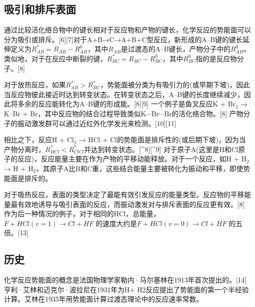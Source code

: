 \subsection{吸引和排斥表面}
通过比较活化络合物中的键长相对于反应物和产物的键长，化学反应的势能面可以分为吸引或排斥。[6][7]对于A+B→C→A+B+C型反应，新形成的A–B键的键长延伸定义为$R^*_{AB} = R_{AB} - R^0_{AB}$，其中$R_{AB}$是过渡态的A–B键长，产物分子中的$R^0_{AB}$。类似地，对于在反应中断裂的键，$R^*_{BC} = R_{BC} - R^0_{BC}$，其中$R^0_{BC}$指的是反应物分子。[8]

对于放热反应，如果$R^*_{AB} > R^*_{BC}$，势能面被分类为有吸引力的(或早期下坡)，因此当反应物彼此接近时达到转变状态。在转变状态之后，A–B键的长度继续减少，因此将多余的反应能转化为A–B键的形成能。[8][9] 一个例子是鱼叉反应K + Br$_2$ → K–Br + Br，其中反应物的结合过程导致类似K$\cdots$Br$\cdots$Br的活化络合物。[8] 产物分子的振动激发群可以通过近红外化学发光来检测。[10][11]

相比之下，反应H + Cl$_2$ → HCl + Cl的势能面是排斥性的(或后期下坡)，因为当产物分离时，$R^*_{HCl} < R^*_{ClCl}$并达到转变状态。[^8][^9] 对于原子A(这里是H和Cl原子的反应)，反应能量主要在作为产物的平移动能释放。对于一个反应，如H + H$_2$ → H + H$_2$，其原子A比B和C重，这些结合能量主要被转化为振动和平移，即使势能面是排斥的。

对于吸热反应，表面的类型决定了最能有效引发反应的能量类型。反应物的平移能量最有效地诱导与吸引表面的反应，而振动激发对与排斥表面的反应更有效。[8] 作为后一种情况的例子，对于相同的HCl，总能量， $F + HCl(v=1) \rightarrow Cl + HF$ 的速度大约是$F + HCl(v=0) \rightarrow Cl + HF$ 的五倍。[13]

\subsection{历史}
化学反应势能面的概念是法国物理学家勒内·马尔塞林在1913年首次提出的。[14] 亨利·艾林和迈克尔·波拉尼在1931年为H+ H2反应提出了势能面的第一个半经验计算。艾林在1935年用势能面计算过渡态理论中的反应速率常数。

